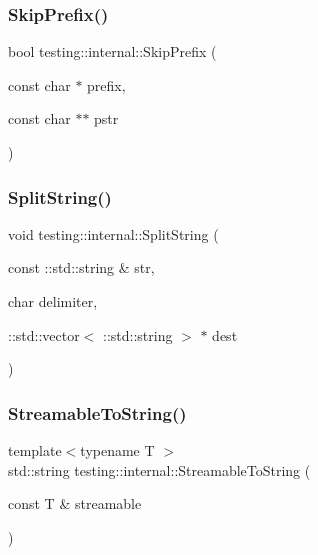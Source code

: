 \mbox{\label{namespacetesting_1_1internal_a244d9a3765727306b597b8992ab84036}} 
\subsubsection{\texorpdfstring{SkipPrefix()}{SkipPrefix()}}
{\footnotesize\ttfamily bool testing\+::internal\+::\+Skip\+Prefix (\begin{DoxyParamCaption}\item[{const char $\ast$}]{prefix,  }\item[{const char $\ast$$\ast$}]{pstr }\end{DoxyParamCaption})}

\mbox{\label{namespacetesting_1_1internal_a8eb8eddf760375a490e007b20777ec56}} 
\subsubsection{\texorpdfstring{SplitString()}{SplitString()}}
{\footnotesize\ttfamily void testing\+::internal\+::\+Split\+String (\begin{DoxyParamCaption}\item[{const \+::std\+::string \&}]{str,  }\item[{char}]{delimiter,  }\item[{\+::std\+::vector$<$ \+::std\+::string $>$ $\ast$}]{dest }\end{DoxyParamCaption})}

\mbox{\label{namespacetesting_1_1internal_aad4beed95d0846e6ffc5da0978ef3bb9}} 
\subsubsection{\texorpdfstring{StreamableToString()}{StreamableToString()}}
{\footnotesize\ttfamily template$<$typename T $>$ \\
std\+::string testing\+::internal\+::\+Streamable\+To\+String (\begin{DoxyParamCaption}\item[{const T \&}]{streamable }\end{DoxyParamCaption})}

